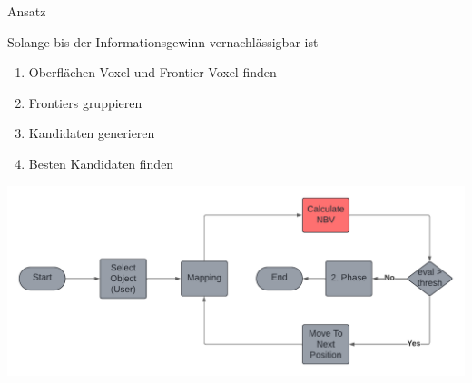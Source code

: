 \documentclass[aspectratio=169]{beamer}
\begin{document}
\begin{frame}{Ansatz}
	\begin{minipage}{0.49\textwidth}
		\begin{exampleblock}{}
			Solange bis der Informationsgewinn vernachlässigbar ist
			\begin{enumerate}
				\item Oberflächen-Voxel und Frontier Voxel finden
				\item Frontiers gruppieren
				\item Kandidaten generieren
				\item Besten Kandidaten finden
			\end{enumerate}
		\end{exampleblock}
	\end{minipage}
	\hfill
	\begin{minipage}{0.49\textwidth}
		\begin{center}
			\includegraphics[width=1.0\textwidth]{Graphics/flow_chart_nbv.pdf}
		\end{center}
	\end{minipage}


\end{frame}
\end{document}
